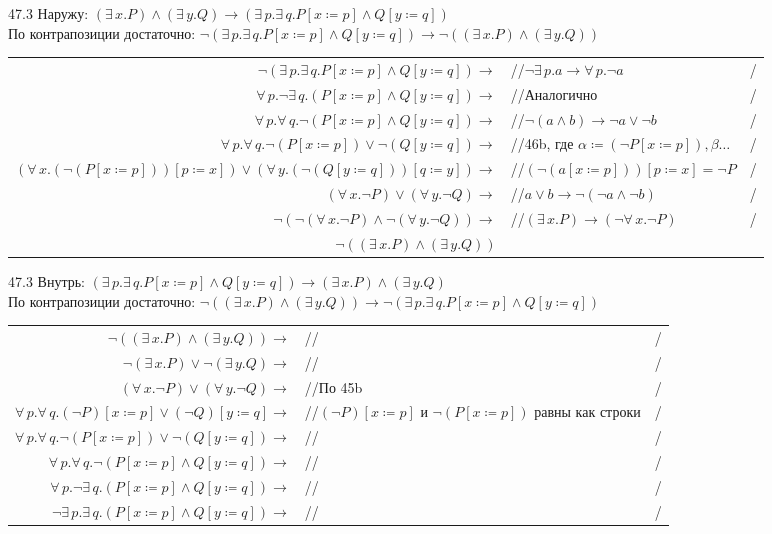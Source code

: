 \documentclass[12pt]{article}
\begin{document}
47.3 Наружу: $(\exists\,x.P)\wedge(\exists\,y.Q)\to(\exists\,p.\exists\,q.P[x\coloneqq p]\wedge Q[y\coloneqq q])$\\
По контрапозиции достаточно: $\neg(\exists\,p.\exists\,q.P[x\coloneqq p]\wedge Q[y\coloneqq q])\to\neg((\exists\,x.P)\wedge(\exists\,y.Q))$\\
\begin{tabular*}{\textwidth}{r l l}
	$\neg(\exists\,p.\exists\,q.P[x\coloneqq p]\wedge Q[y\coloneqq q])\to$&//$\neg\exists\,p.a\to\forall\,p.\neg a$&/\\
	$\forall\,p.\neg \exists\,q.(P[x\coloneqq p]\wedge Q[y\coloneqq q])\to$&//Аналогично&/\\
	$\forall\,p.\forall\,q.\neg(P[x\coloneqq p]\wedge Q[y\coloneqq q])\to$&//$\neg(a\wedge b)\to\neg a\vee\neg b$&/\\
	$\forall\,p.\forall\,q.\neg(P[x\coloneqq p])\vee\neg(Q[y\coloneqq q])\to$&//46b, где $\alpha\coloneqq(\neg P[x\coloneqq p]), \beta\ldots$&/\\
	$(\forall\,x.(\neg(P[x\coloneqq p]))[p\coloneqq x])\vee(\forall\,y.(\neg(Q[y\coloneqq q]))[q\coloneqq y])\to$&//$(\neg(a[x\coloneqq p]))[p\coloneqq x]=\neg P$&/\\
	$(\forall\,x.\neg P)\vee(\forall\,y.\neg Q)\to$&//$a\vee b\to\neg(\neg a\wedge\neg b)$&/\\
	$\neg(\neg(\forall\,x.\neg P)\wedge\neg(\forall\,y.\neg Q))\to$&//$(\exists\,x.P)\to(\neg\forall\,x.\neg P)$&/\\
	$\neg((\exists\,x.P)\wedge(\exists\,y.Q))$&&\\
\end{tabular*}
47.3 Внутрь: $(\exists\,p.\exists\,q.P[x\coloneqq p]\wedge Q[y\coloneqq q])\to(\exists\,x.P)\wedge(\exists\,y.Q)$\\
По контрапозиции достаточно: $\neg((\exists\,x.P)\wedge(\exists\,y.Q))\to\neg(\exists\,p.\exists\,q.P[x\coloneqq p]\wedge Q[y\coloneqq q])$\\
\begin{tabular*}{\textwidth}{r l l}
	$\neg((\exists\,x.P)\wedge(\exists\,y.Q))\to$&//&/\\
	$\neg(\exists\,x.P)\vee\neg(\exists\,y.Q)\to$&//&/\\
	$(\forall\,x.\neg P)\vee(\forall\,y.\neg Q)\to$&//По 45b&/\\
	$\forall\,p.\forall\,q.(\neg P)[x\coloneqq p]\vee(\neg Q)[y\coloneqq q]\to$&//$(\neg P)[x\coloneqq p]$ и $\neg (P[x\coloneqq p])$ равны как строки&/\\
	$\forall\,p.\forall\,q.\neg (P[x\coloneqq p])\vee\neg(Q[y\coloneqq q])\to$&//&/\\
	$\forall\,p.\forall\,q.\neg(P[x\coloneqq p]\wedge Q[y\coloneqq q])\to$&//&/\\
	$\forall\,p.\neg\exists\,q.(P[x\coloneqq p]\wedge Q[y\coloneqq q])\to$&//&/\\
	$\neg\exists\,p.\exists\,q.(P[x\coloneqq p]\wedge Q[y\coloneqq q])\to$&//&/
\end{tabular*}
\end{document}
